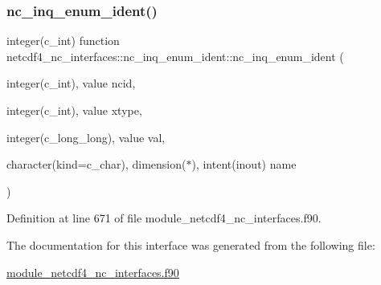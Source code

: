\subsubsection{\texorpdfstring{nc\+\_\+inq\+\_\+enum\+\_\+ident()}{nc\_inq\_enum\_ident()}}
{\footnotesize\ttfamily integer(c\+\_\+int) function netcdf4\+\_\+nc\+\_\+interfaces\+::nc\+\_\+inq\+\_\+enum\+\_\+ident\+::nc\+\_\+inq\+\_\+enum\+\_\+ident (\begin{DoxyParamCaption}\item[{integer(c\+\_\+int), value}]{ncid,  }\item[{integer(c\+\_\+int), value}]{xtype,  }\item[{integer(c\+\_\+long\+\_\+long), value}]{val,  }\item[{character(kind=c\+\_\+char), dimension($\ast$), intent(inout)}]{name }\end{DoxyParamCaption})}



Definition at line 671 of file module\+\_\+netcdf4\+\_\+nc\+\_\+interfaces.\+f90.



The documentation for this interface was generated from the following file\+:\begin{DoxyCompactItemize}
\item 
\hyperlink{module__netcdf4__nc__interfaces_8f90}{module\+\_\+netcdf4\+\_\+nc\+\_\+interfaces.\+f90}\end{DoxyCompactItemize}
